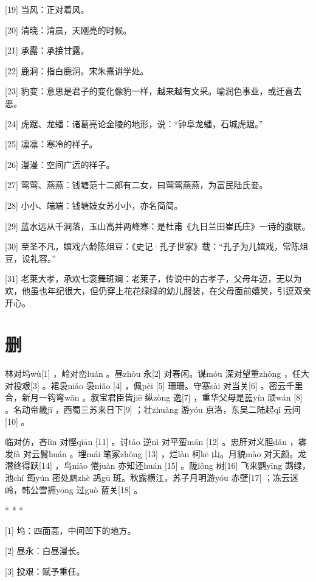 \documentclass[12pt,UTF8]{ctexbook}
\begin{document}
[19] 当风：正对着风。

[20] 清晓：清晨，天刚亮的时候。

[21] 承露：承接甘露。

[22] 鹿洞：指白鹿洞。宋朱熹讲学处。

[23] 豹变：意思是君子的变化像豹一样，越来越有文采。喻润色事业，或迁喜去恶。

[24] 虎踞、龙蟠：诸葛亮论金陵的地形，说：“钟阜龙蟠，石城虎踞。”

[25] 凛凛：寒冷的样子。

[26] 漫漫：空间广远的样子。

[27] 莺莺、燕燕：钱塘范十二郎有二女，曰莺莺燕燕，为富民陆氏妾。

[28] 小小、端端：钱塘妓女苏小小，亦名简简。

[29] 蓝水远从千涧落，玉山高并两峰寒：是杜甫《九日兰田崔氏庄》一诗的腹联。

[30] 至圣不凡，嬉戏六龄陈俎豆：《史记·孔子世家》载：“孔子为儿嬉戏，常陈俎豆，设礼容。”

[31] 老莱大孝，承欢七衮舞斑斓：老莱子，传说中的古孝子，父母年迈，无以为欢，他虽也年纪很大，但仍穿上花花绿绿的幼儿服装，在父母面前嬉笑，引逗双亲开心。





\chapter{删}


林对坞wù[1] ，岭对峦luán 。昼zhòu 永[2] 对春闲。谋móu 深对望重zhòng ，任大对投艰[3] 。裙袅niǎo 袅niǎo [4] ，佩pèi [5] 珊珊。守塞sài 对当关[6] 。密云千里合，新月一钩弯wān 。叔宝君臣皆jiē 纵zòng 逸[7] ，重华父母是嚚yín 顽wán [8] 。名动帝畿jī ，西蜀三苏来日下[9] ；壮zhuàng 游yóu 京洛，东吴二陆起qǐ 云间[10] 。

临对仿，吝lìn 对悭qiān [11] 。讨tǎo 逆nì 对平蛮mán [12] 。忠肝对义胆dǎn ，雾发fà 对云鬟huán 。埋mái 笔冢zhǒng [13] ，烂làn 柯kē 山。月貌mào 对天颜。龙潜终得跃[14] ，鸟niǎo 倦juàn 亦知还huán [15] 。陇lǒng 树[16] 飞来鹦yīng 鹉绿，池chí 筠yún 密处鹧zhè 鸪gū 斑。秋露横江，苏子月明游yóu 赤壁[17] ；冻云迷岭，韩公雪拥yōng 过guò 蓝关[18] 。



* * *



[1] 坞：四面高，中间凹下的地方。

[2] 昼永：白昼漫长。

[3] 投艰：赋予重任。
\end{document}
